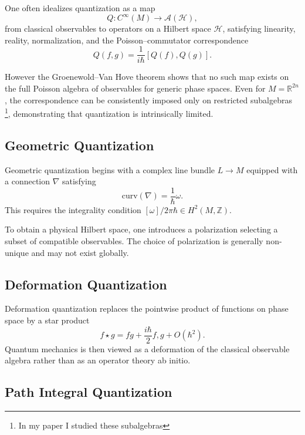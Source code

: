 One often idealizes quantization as a map
\begin{equation}
Q : C^\infty(M) \to \mathcal{A}(\mathcal{H}),
\end{equation}
from classical observables to operators on a Hilbert space $\mathcal{H}$, satisfying 
linearity, reality, normalization, and the Poisson--commutator correspondence
\begin{equation}
Q({f,g}) = \frac{1}{i\hbar}[Q(f),Q(g)].
\end{equation}

However the Groenewold--Van Hove theorem shows that no such map exists on the full 
Poisson algebra of observables for generic phase spaces. 
Even for $M=\mathbb{R}^{2n}$, the correspondence can be consistently imposed only on 
restricted subalgebras \footnote{ In my paper \cite{panfil-q} I studied these subalgebras},
demonstrating that quantization is intrinsically limited.

\subsection{Geometric Quantization}


Geometric quantization begins with a complex line bundle $L \to M$ equipped with a connection $\nabla$ satisfying
\begin{equation}
\mathrm{curv}(\nabla) = \frac{1}{\hbar}\omega.
\end{equation}
This requires the integrality condition $[\omega]/2\pi\hbar \in H^2(M,\mathbb{Z})$.


To obtain a physical Hilbert space, one introduces a polarization selecting a subset of compatible observables. The choice of polarization is generally non-unique and may not exist globally.

\subsection{Deformation Quantization}

Deformation quantization replaces the pointwise product of functions on phase space by a star product
\begin{equation}
f \star g = fg + \frac{i\hbar}{2}{f,g} + O(\hbar^2).
\end{equation}
Quantum mechanics is then viewed as a deformation of the classical observable algebra rather than as an operator theory ab initio.

\subsection{Path Integral Quantization}

